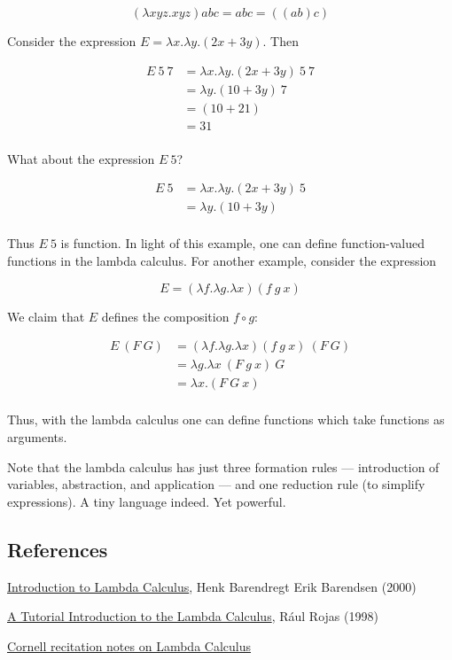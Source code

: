 \begin{equation}
  (\lambda xyz .xyz) abc = abc = ((ab)c)
\end{equation}


Consider the expression $E = \lambda x. \lambda y. (2x + 3y)$. Then

\begin{align}
 E\ 5\ 7 &= \lambda x. \lambda y. (2x + 3y)\ 5\ 7\\
  &= \lambda y . (10 + 3y)\ 7 \\
  &= (10 + 21) \\
  &= 31 \\
\end{align}

What about the expression $E\ 5$?

\begin{align}
 E\ 5 &= \lambda x. \lambda y. (2x + 3y)\ 5\\
  &= \lambda y . (10 + 3y) \\
\end{align}

Thus $E\ 5$ is function.  In light of this example, one can define function-valued functions in the lambda calculus.  For another example, consider the expression

$$
E = (\lambda f . \lambda g . \lambda x)(f\ g\ x)
$$

We claim that $E$ defines the composition $f\circ g$:

\begin{align}
E\ (F\ G) &= (\lambda f . \lambda g . \lambda x)(f\ g\ x)\ (F\ G) \\
&= \lambda g . \lambda x\ (F\ g\ x)\ G \\
&= \lambda x . (F\ G\ x) \\
\end{align}

Thus, with the lambda calculus one can define functions which take functions as arguments.

Note that the lambda calculus has just three formation rules — introduction of variables, abstraction, and application — and one reduction rule (to simplify expressions). A tiny language indeed.  Yet powerful.

\subsection{References}

\href{http://www.cse.chalmers.se/research/group/logic/TypesSS05/Extra/geuvers.pdf}{Introduction to Lambda Calculus}, Henk Barendregt Erik Barendsen (2000)

\href{https://www.inf.fu-berlin.de/lehre/WS03/alpi/lambda.pdf}{A Tutorial Introduction to the Lambda Calculus}, Rául Rojas (1998)

\href{http://www.cs.cornell.edu/courses/cs312/2008sp/recitations/rec26.html}{Cornell recitation notes on Lambda Calculus}
